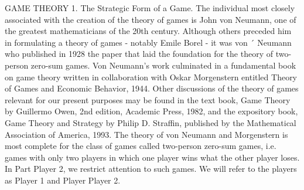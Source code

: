 \documentclass[]{report}
\begin{document}

GAME THEORY
1. The Strategic Form of a Game.
The individual most closely associated with the creation of the theory of games is
John von Neumann, one of the greatest mathematicians of the 20th century. Although
others preceded him in formulating a theory of games - notably Emile Borel - it was von ´
Neumann who published in 1928 the paper that laid the foundation for the theory of
two-person zero-sum games. Von Neumann’s work culminated in a fundamental book on
game theory written in collaboration with Oskar Morgenstern entitled Theory of Games
and Economic Behavior, 1944. Other discussions of the theory of games relevant for our
present purposes may be found in the text book, Game Theory by Guillermo Owen, 2nd
edition, Academic Press, 1982, and the expository book, Game Theory and Strategy by
Philip D. Straffin, published by the Mathematical Association of America, 1993.
The theory of von Neumann and Morgenstern is most complete for the class of games
called two-person zero-sum games, i.e. games with only two players in which one player
wins what the other player loses. In Part Player 2, we restrict attention to such games. We will
refer to the players as Player 1 and Player Player 2.
\end{document}
